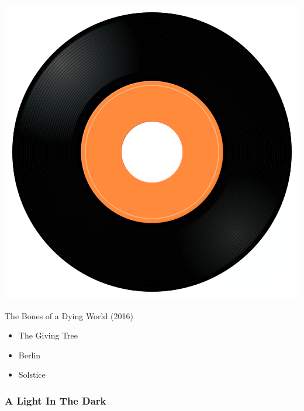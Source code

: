 \begin{minipage}[t]{0.25\textwidth}
\captionsetup{type=figure}
\includegraphics[width=\textwidth]{Images/cover.png}
\caption*{The Bones of a Dying World (2016)}
\end{minipage}
\begin{minipage}[t]{0.25\textwidth}\vspace{0pt}
\begin{itemize}[nosep,leftmargin=1em,labelwidth=*,align=left]
	\setlength{\itemsep}{0pt}
	\item The Giving Tree
	\item Berlin
	\item Solstice
\end{itemize}
\end{minipage}

\subsubsection{A Light In The Dark}

